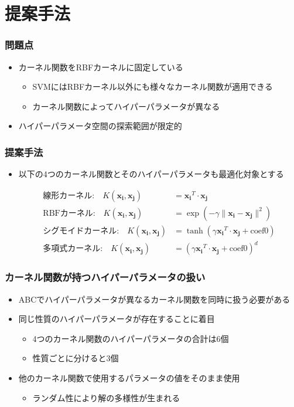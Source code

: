 \documentclass[11pt,dvipdfmx,cjk]{beamer}
\begin{document}
\section{提案手法}
  \begin{frame}
    \frametitle{問題点}
    \begin{itemize}
      \item カーネル関数をRBFカーネルに固定している
      \begin{itemize}
       \item SVMにはRBFカーネル以外にも様々なカーネル関数が適用できる      
      \item カーネル関数によってハイパーパラメータが異なる
    \end{itemize}
    \item ハイパーパラメータ空間の探索範囲が限定的
  \end{itemize}
\end{frame}
  
  \begin{frame}
    \frametitle{提案手法}
    \begin{itemize}
      \item 以下の4つのカーネル関数とそのハイパーパラメータも最適化対象とする
      
      \begin{align*}
        \text{線形カーネル:} \quad K(\boldsymbol{x_i}, \boldsymbol{x_j}) &= \boldsymbol{x_i}^T \cdot \boldsymbol{x_j} \\
        \text{RBFカーネル:} \quad K(\boldsymbol{x_i}, \boldsymbol{x_j}) &= \exp\left(-\gamma \| \boldsymbol{x_i} - \boldsymbol{x_j} \|^2\right) \\
        \text{シグモイドカーネル:} \quad K(\boldsymbol{x_i}, \boldsymbol{x_j}) &= \tanh(\gamma \boldsymbol{x_i}^T \cdot \boldsymbol{x_j} + \text{coef0}) \\
        \text{多項式カーネル:} \quad K(\boldsymbol{x_i}, \boldsymbol{x_j}) &= (\gamma\boldsymbol{x_i}^T \cdot \boldsymbol{x_j} + \text{coef0})^d
       \end{align*}
    \end{itemize}
  \end{frame}
\begin{frame}
  \frametitle{カーネル関数が持つハイパーパラメータの扱い}
  \begin{itemize}
  \item ABCでハイパーパラメータが異なるカーネル関数を同時に扱う必要がある
  \item  同じ性質のハイパーパラメータが存在することに着目
      \begin{itemize}
      \item 4つのカーネル関数のハイパーパラメータの合計は6個
      \item 性質ごとに分けると3個
     \end{itemize}
  \item  他のカーネル関数で使用するパラメータの値をそのまま使用
     \begin{itemize}
     \item  ランダム性により解の多様性が生まれる
    \end{itemize}
  \end{itemize}
\end{frame}
\end{document}
